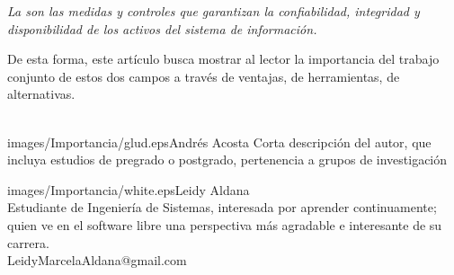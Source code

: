 \begin{multicols}{2}
\vspace{0.3cm}

\begin{entradilla}
{\em La {\color{introcolor}{seguridad informática}} son las medidas y controles que garantizan la confiabilidad, integridad y disponibilidad de los activos del sistema de información.}
\end{entradilla}

De esta forma, este artículo busca mostrar al lector la importancia del trabajo conjunto de estos dos campos a través de ventajas, de herramientas, de alternativas.
\\ \\



\medskip






\begin{biografia}{images/Importancia/glud.eps}{Andrés Acosta} 
Corta descripción del autor, que incluya estudios de pregrado o postgrado, pertenencia a grupos de investigación
\end{biografia}

\begin{biografia}{images/Importancia/white.eps}{Leidy Aldana} 
\\Estudiante de Ingeniería de Sistemas, interesada por aprender continuamente; quien ve en el software libre una perspectiva más agradable e interesante de su carrera.\\LeidyMarcelaAldana@gmail.com

\end{biografia}

\raggedcolumns
\pagebreak


\end{multicols}

\clearpage
\pagebreak
